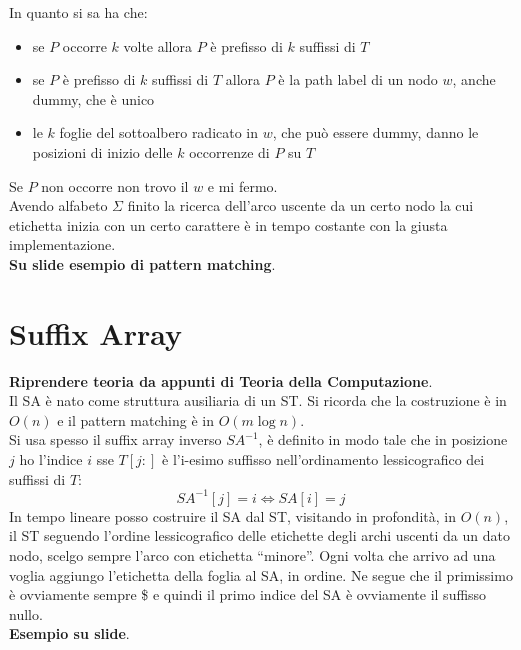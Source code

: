 \documentclass[a4paper,12pt, oneside]{book}
\begin{document}
In quanto si sa ha che:
\begin{itemize}
  \item se $P$ occorre $k$ volte allora $P$ è prefisso di $k$ suffissi di $T$
  \item se $P$ è prefisso di $k$ suffissi di $T$ allora $P$ è la path label di
  un nodo $w$, anche dummy, che è unico
  \item le $k$ foglie del sottoalbero radicato in $w$, che può essere dummy,
  danno le posizioni di 
  inizio delle $k$ occorrenze di $P$ su $T$
\end{itemize}
Se $P$ non occorre non trovo il $w$ e mi fermo.\\
Avendo alfabeto $\Sigma$ finito la ricerca dell'arco uscente da un certo nodo la
cui etichetta inizia con un certo carattere è in tempo costante con la giusta
implementazione.\\
\textbf{Su slide esempio di pattern matching}.
\section{Suffix Array}
\textbf{Riprendere teoria da appunti di Teoria della Computazione}.\\
Il SA è nato come struttura ausiliaria di un ST. Si ricorda che la costruzione è
in $O(n)$ e il pattern matching è in $O(m\log n)$.\\
Si usa spesso il suffix array inverso $SA^{-1}$, è definito in modo tale che in
posizione $j$ ho l'indice $i$ sse $T[j:]$ è l'i-esimo suffisso nell'ordinamento
lessicografico dei suffissi di $T$:
\[SA^{-1}[j]=i \iff SA[i]=j\]
In tempo lineare posso costruire il SA dal ST, visitando in profondità, in
$O(n)$, il ST seguendo l'ordine lessicografico delle etichette degli archi
uscenti da un dato nodo, scelgo sempre l'arco con etichetta ``minore''. Ogni
volta che arrivo ad una voglia aggiungo l'etichetta della foglia al SA, in
ordine. Ne segue che il primissimo è ovviamente sempre \$ e quindi il primo
indice del SA è ovviamente il suffisso nullo.\\
\textbf{Esempio su slide}.\\
\end{document}

